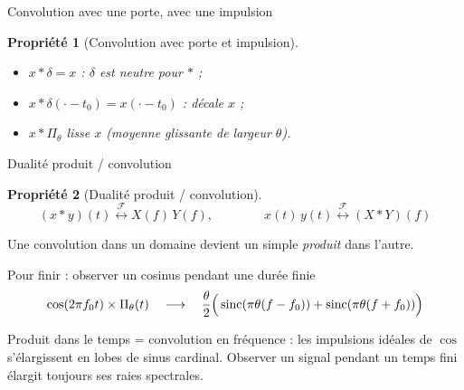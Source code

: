 \documentclass[aspectratio=43,10pt]{beamer}
\newtheorem{proposition}{Propriété}
\newcommand{\highlight}[1]{{\color{niceblue}\emph{#1}}}
\newcommand{\tf}{\overset{\mathcal F}{\longleftrightarrow}}
\newcommand{\slidefig}[2]{%
\begin{center}
\resizebox{#1}{!}{}
\end{center}
}
\begin{document}
\begin{frame}{Convolution avec une porte, avec une impulsion}
    \begin{proposition}[Convolution avec porte et impulsion]
        \begin{itemize}
            \item $x*\delta = x$ : $\delta$ est neutre pour $*$ ;
            \item $x*\delta(\cdot-t_0) = x(\cdot-t_0)$ : décale $x$ ;
            \item $x*\Pi_\theta$ lisse $x$ (moyenne glissante de largeur $\theta$).
        \end{itemize}
    \end{proposition}
    \slidefig{.9\textwidth}{conv-shift-illustration.tex}
\end{frame}

\begin{frame}{Dualité produit / convolution}
    \begin{proposition}[Dualité produit / convolution]
        $$
            (x*y)(t) \tf X(f)\,Y(f), \qquad\qquad x(t)\,y(t) \tf (X*Y)(f)
        $$
    \end{proposition}
    \begin{center}
        Une convolution dans un domaine devient un simple
        \highlight{produit} dans l'autre.
    \end{center}
\end{frame}

\begin{frame}{Pour finir : observer un cosinus pendant une durée finie}
    \[
        \cos(2\pi f_0t)\times\Pi_\theta(t) \quad\longrightarrow\quad
        \frac\theta2\Big(\operatorname{sinc}(\pi\theta(f-f_0)) + \operatorname{sinc}(\pi\theta(f+f_0))\Big)
    \]
    \slidefig{\textwidth}{windowed-cosine-spectrum.tex}
    \begin{center}
        \small Produit dans le temps = convolution en fréquence : les
        impulsions idéales de $\cos$ s'élargissent en lobes de sinus
        cardinal. Observer un signal pendant un temps fini élargit
        toujours ses raies spectrales.
    \end{center}
\end{frame}
\end{document}
